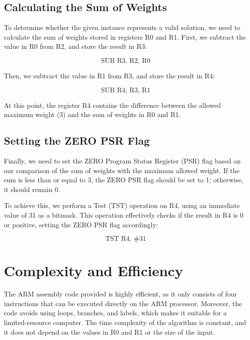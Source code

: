 \subsection{Calculating the Sum of Weights}

To determine whether the given instance represents a valid solution, we need to calculate the sum of weights stored in registers R0 and R1. First, we subtract the value in R0 from R2, and store the result in R3:

\begin{equation}
\text{SUB R3, R2, R0}
\end{equation}

Then, we subtract the value in R1 from R3, and store the result in R4:

\begin{equation}
\text{SUB R4, R3, R1}
\end{equation}

At this point, the register R4 contains the difference between the allowed maximum weight (3) and the sum of weights in R0 and R1.

\subsection{Setting the ZERO PSR Flag}

Finally, we need to set the ZERO Program Status Register (PSR) flag based on our comparison of the sum of weights with the maximum allowed weight. If the sum is less than or equal to 3, the ZERO PSR flag should be set to 1; otherwise, it should remain 0.

To achieve this, we perform a Test (TST) operation on R4, using an immediate value of 31 as a bitmask. This operation effectively checks if the result in R4 is 0 or positive, setting the ZERO PSR flag accordingly:

\begin{equation}
\text{TST R4, \#31}
\end{equation}

\section{Complexity and Efficiency}

The ARM assembly code provided is highly efficient, as it only consists of four instructions that can be executed directly on the ARM processor. Moreover, the code avoids using loops, branches, and labels, which makes it suitable for a limited-resource computer. The time complexity of the algorithm is constant, and it does not depend on the values in R0 and R1 or the size of the input.

